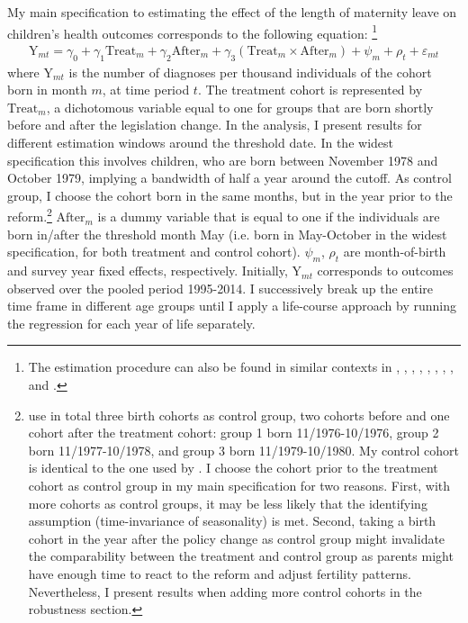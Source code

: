 \documentclass[11pt, a4paper,draft]{article} %
\begin{document}
My main specification to estimating the effect of the length of maternity leave on children's health outcomes corresponds to the following equation: \footnote{The estimation procedure can also be found in similar contexts in \cite{RafaelLaliveandJosefZweimuller2009}, \cite{Dustmann2012}, \cite{Ekberg2013parental}, \cite{schonberg2014expansions}, \cite{Lalive2014}, \cite{Huebener2017}, \cite{danzer2017}, \cite{guertzgen2018}, and \cite{avdic2018modern}.}
\begin{align}
\text{Y}_{mt} = \gamma_0 + \gamma_1 \text{Treat}_{m} + \gamma_2 \text{After}_{m} + \gamma_3 (\text{Treat}_{m} \times \text{After}_{m}) + \psi_m + \rho_t + \varepsilon_{mt} \label{eq:DD_basline}
\end{align}
where $\text{Y}_{mt}$ is the number of diagnoses per thousand individuals of the cohort born in month $m$, at time period $t$. The treatment cohort is represented by $\text{Treat}_{m}$, a dichotomous variable equal to one for groups that are born shortly before and after the legislation change. In the analysis, I present results for different estimation windows around the threshold date. In the widest specification this involves children, who are born between November 1978 and October 1979, implying a bandwidth of half a year around the cutoff. As control group, I choose the cohort born in the same months, but in the year prior to the reform.\footnote{\cite{Dustmann2012} use in total three birth cohorts as control group, two cohorts before and one cohort after the treatment cohort: group 1 born 11/1976-10/1976, group 2 born 11/1977-10/1978, and group 3 born 11/1979-10/1980. My control cohort is identical to the one used by \cite{guertzgen2018}. \newline I choose the cohort prior to the treatment cohort as control group in my main specification for two reasons. First, with more cohorts as control groups, it may be less likely that the identifying assumption (time-invariance of seasonality) is met. Second, taking a birth cohort in the year after the policy change as control group might invalidate the comparability between the treatment and control group as parents might have enough time to react to the reform and adjust fertility patterns. Nevertheless, I present results when adding more control cohorts in the robustness section.} $\text{After}_{m}$ is a dummy variable that is equal to one if the individuals are born in/after the threshold month May (i.e. born in May-October in the widest specification, for both treatment and control cohort). $\psi_m$, $\rho_t$ are month-of-birth and survey year fixed effects, respectively. Initially, $\text{Y}_{mt}$ corresponds to outcomes observed over the pooled period 1995-2014. I successively break up the entire time frame in different age groups until I apply a life-course approach by running the regression for each year of life separately.\newline 
\end{document}
